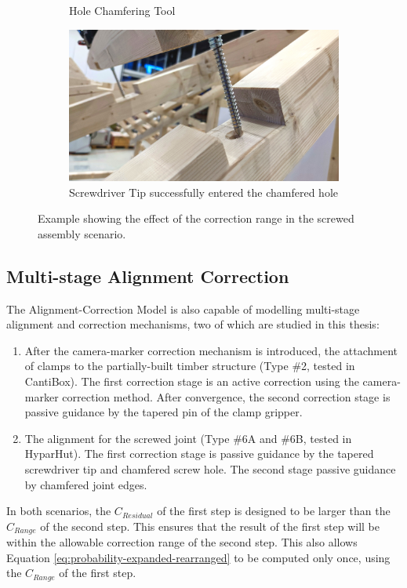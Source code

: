 \begin{figure}
\begin{subfigure}[b]{0.49\textwidth}
        \caption{Hole Chamfering Tool}
        \label{fig:chamfering_tool}
    \end{subfigure}
    \hfill
    \begin{subfigure}[b]{0.49\textwidth}
        \centering
        \includegraphics[width=\textwidth]{images/09/Correction Successful.jpg}
        \caption{Screwdriver Tip successfully entered the chamfered hole}
        \label{fig:screwdriver_tip_successful}
    \end{subfigure}
    \caption{Example showing the effect of the correction range in the screwed assembly scenario.}
    \label{fig:screwed-assembly-scenario}
\end{figure}

\FloatBarrier

\subsection{Multi-stage Alignment Correction}
\label{subsection:new-hypo-multi-stage-alignment-correction}

The Alignment-Correction Model is also capable of modelling multi-stage alignment and correction mechanisms, two of which are studied in this thesis:

\begin{enumerate}
	\item After the camera-marker correction mechanism is introduced, the attachment of clamps to the partially-built timber structure (Type \#2, tested in CantiBox). The first correction stage is an active correction using the camera-marker correction method. After convergence, the second correction stage is passive guidance by the tapered pin of the clamp gripper.

	\item The alignment for the screwed joint (Type \#6A and \#6B, tested in HyparHut). The first correction stage is passive guidance by the tapered screwdriver tip and chamfered screw hole. The second stage passive guidance by chamfered joint edges.

\end{enumerate}
In both scenarios, the $C_{Residual}$ of the first step is designed to be larger than the $C_{Range}$ of the second step. This ensures that the result of the first step will be within the allowable correction range of the second step. This also allows Equation \ref{eq:probability-expanded-rearranged} to be computed only once, using the $C_{Range}$ of the first step.

